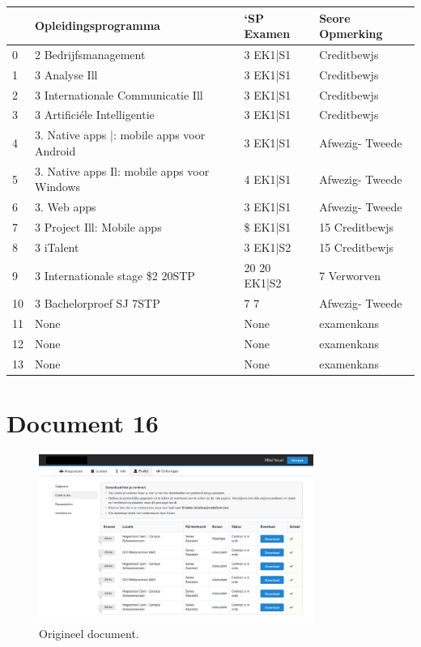 \begin{tabular}{llll}
\toprule
{} &                          Opleidingsprogramma &    ‘SP Examen &  Seore Opmerking \\
\midrule
0  &                         2 Bedrijfsmanagement &      3 EK1|S1 &      Creditbewjs \\
1  &                                3 Analyse Ill &      3 EK1|S1 &      Creditbewjs \\
2  &            3 Internationale Communicatie Ill &      3 EK1|S1 &      Creditbewjs \\
3  &                  3 Artificiéle Intelligentie &      3 EK1|S1 &      Creditbewjs \\
4  &   3. Native apps |: mobile apps voor Android &      3 EK1|S1 &  Afwezig- Tweede \\
5  &  3. Native apps Il: mobile apps voor Windows &      4 EK1|S1 &  Afwezig- Tweede \\
6  &                                  3. Web apps &      3 EK1|S1 &  Afwezig- Tweede \\
7  &                   3 Project Ill: Mobile apps &      \$ EK1|S1 &   15 Creditbewjs \\
8  &                                    3 iTalent &      3 EK1|S2 &   15 Creditbewjs \\
9  &              3 Internationale stage \$2 20STP &  20 20 EK1|S2 &      7 Verworven \\
10 &                      3 Bachelorproef SJ 7STP &           7 7 &  Afwezig- Tweede \\
11 &                                         None &          None &       examenkans \\
12 &                                         None &          None &       examenkans \\
13 &                                         None &          None &       examenkans \\
\bottomrule
\end{tabular}
\section{Document 16}

\begin{figure}[H]
    \centering
    \includegraphics[width=0.8\textwidth]{test-resultaten/16/original.png}
    \caption{Origineel document.}
\end{figure}

